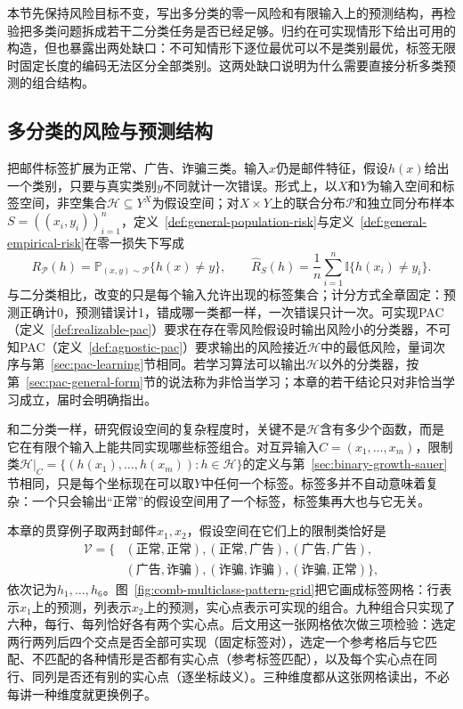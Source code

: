 本节先保持风险目标不变，写出多分类的零一风险和有限输入上的预测结构，再检验把多类问题拆成若干二分类任务是否已经足够。归约在可实现情形下给出可用的构造，但也暴露出两处缺口：不可知情形下逐位最优可以不是类别最优，标签无限时固定长度的编码无法区分全部类别。这两处缺口说明为什么需要直接分析多类预测的组合结构。

\subsection{多分类的风险与预测结构}
\label{sec:lt6-risk-structure}

把邮件标签扩展为正常、广告、诈骗三类。输入$x$仍是邮件特征，假设$h(x)$给出一个类别，只要与真实类别$y$不同就计一次错误。形式上，以$X$和$Y$为输入空间和标签空间，非空集合$\mathcal H\subseteq Y^X$为假设空间；对$X\times Y$上的联合分布$\mathcal P$和独立同分布样本$S=((x_i,y_i))_{i=1}^n$，定义~\ref{def:general-population-risk}与定义~\ref{def:general-empirical-risk}在零一损失下写成
\begin{equation}
 R_{\mathcal P}(h)=\mathbb P_{(x,y)\sim\mathcal P}\{h(x)\neq y\},\qquad
 \hat R_S(h)=\frac1n\sum_{i=1}^n\mathbb I\{h(x_i)\neq y_i\}.
 \label{eq:multiclass-risk}
\end{equation}
与二分类相比，改变的只是每个输入允许出现的标签集合；计分方式全章固定：预测正确计0，预测错误计1，错成哪一类都一样，一次错误只计一次。可实现PAC（定义~\ref{def:realizable-pac}）要求在存在零风险假设时输出风险小的分类器，不可知PAC（定义~\ref{def:agnostic-pac}）要求输出的风险接近$\mathcal H$中的最低风险，量词次序与第~\ref{sec:pac-learning}节相同。若学习算法可以输出$\mathcal H$以外的分类器，按第~\ref{sec:pac-general-form}节的说法称为非恰当学习；本章的若干结论只对非恰当学习成立，届时会明确指出。

和二分类一样，研究假设空间的复杂程度时，关键不是$\mathcal H$含有多少个函数，而是它在有限个输入上能共同实现哪些标签组合。对互异输入$C=(x_1,\ldots,x_m)$，限制类$\mathcal H|_C=\{(h(x_1),\ldots,h(x_m)):h\in\mathcal H\}$的定义与第~\ref{sec:binary-growth-sauer}节相同，只是每个坐标现在可以取$Y$中任何一个标签。标签多并不自动意味着复杂：一个只会输出“正常”的假设空间用了一个标签，标签集再大也与它无关。

本章的贯穿例子取两封邮件$x_1,x_2$，假设空间在它们上的限制类恰好是
\[
 \begin{aligned}
 \mathcal V=\{&(\text{正常},\text{正常}),(\text{正常},\text{广告}),(\text{广告},\text{广告}),\\
 &(\text{广告},\text{诈骗}),(\text{诈骗},\text{诈骗}),(\text{诈骗},\text{正常})\},
 \end{aligned}
\]
依次记为$h_1,\ldots,h_6$。图~\ref{fig:comb-multiclass-pattern-grid}把它画成标签网格：行表示$x_1$上的预测，列表示$x_2$上的预测，实心点表示可实现的组合。九种组合只实现了六种，每行、每列恰好各有两个实心点。后文用这一张网格依次做三项检验：选定两行两列后四个交点是否全部可实现（固定标签对），选定一个参考格后与它匹配、不匹配的各种情形是否都有实心点（参考标签匹配），以及每个实心点在同行、同列是否还有别的实心点（逐坐标歧义）。三种维度都从这张网格读出，不必每讲一种维度就更换例子。

